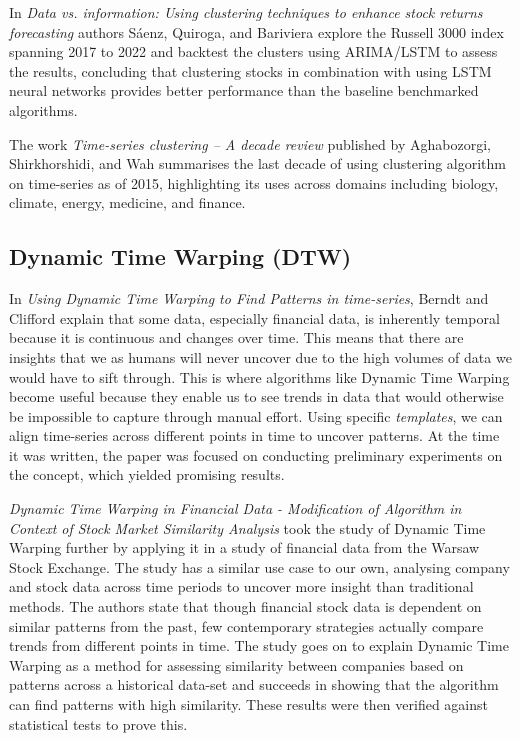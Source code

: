 \documentclass[11pt]{article}
\begin{document}
In \textit{Data vs. information: Using clustering techniques to enhance stock returns forecasting} \cite{dataVsInformation} authors Sáenz, Quiroga, and Bariviera explore the Russell 3000 index spanning 2017 to 2022 and backtest the clusters using ARIMA/LSTM to assess the results, concluding that clustering stocks in combination with using LSTM neural networks provides better performance than the baseline benchmarked algorithms.


The work \textit{Time-series clustering – A decade review} \cite{decadeReview} published by Aghabozorgi, Shirkhorshidi, and Wah summarises the last decade of using clustering algorithm on time-series as of 2015, highlighting its uses across domains including biology, climate, energy, medicine, and finance.

\subsection{Dynamic Time Warping (DTW)}

In \textit{Using Dynamic Time Warping to Find Patterns in time-series}, \cite{dtwBerndt1994} Berndt and Clifford explain that some data, especially financial data, is inherently temporal because it is continuous and changes over time. This means that there are insights that we as humans will never uncover due to the high volumes of data we would have to sift through. This is where algorithms like Dynamic Time Warping become useful because they enable us to see trends in data that would otherwise be impossible to capture through manual effort. Using specific \textit{templates}, we can align time-series across different points in time to uncover patterns. At the time it was written, the paper was focused on conducting preliminary experiments on the concept, which yielded promising results. 

\textit{Dynamic Time Warping in Financial Data - Modification of Algorithm in Context of Stock Market Similarity Analysis} \cite{ref2} took the study of Dynamic Time Warping further by applying it in a study of financial data from the Warsaw Stock Exchange. The study has a similar use case to our own, analysing company and stock data across time periods to uncover more insight than traditional methods. The authors state that though financial stock data is dependent on similar patterns from the past, few contemporary strategies actually compare trends from different points in time. The study goes on to explain Dynamic Time Warping as a method for assessing similarity between companies based on patterns across a historical data-set and succeeds in showing that the algorithm can find patterns with high similarity. These results were then verified against statistical tests to prove this. 
\end{document}
